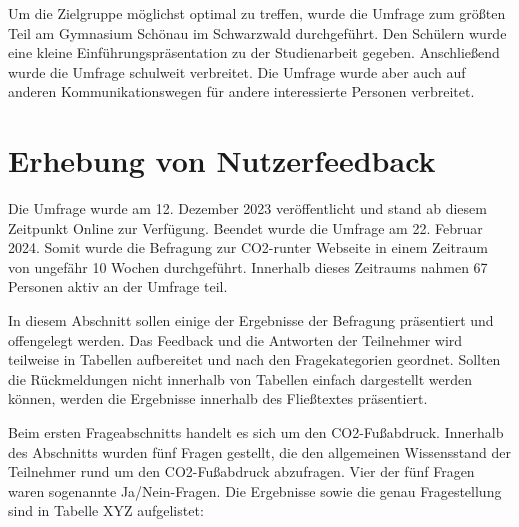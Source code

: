 Um die Zielgruppe möglichst optimal zu treffen, wurde die Umfrage zum größten Teil am Gymnasium Schönau im Schwarzwald durchgeführt.
Den Schülern wurde eine kleine Einführungspräsentation zu der Studienarbeit gegeben.
Anschließend wurde die Umfrage schulweit verbreitet.
Die Umfrage wurde aber auch auf anderen Kommunikationswegen für andere interessierte Personen verbreitet.

\section{Erhebung von Nutzerfeedback}
Die Umfrage wurde am 12. Dezember 2023 veröffentlicht und stand ab diesem Zeitpunkt Online zur Verfügung.
Beendet wurde die Umfrage am 22. Februar 2024.
Somit wurde die Befragung zur CO2-runter Webseite in einem Zeitraum von ungefähr 10 Wochen durchgeführt.
Innerhalb dieses Zeitraums nahmen 67 Personen aktiv an der Umfrage teil.

In diesem Abschnitt sollen einige der Ergebnisse der Befragung präsentiert und offengelegt werden.
Das Feedback und die Antworten der Teilnehmer wird teilweise in Tabellen aufbereitet und nach den Fragekategorien geordnet.
Sollten die Rückmeldungen nicht innerhalb von Tabellen einfach dargestellt werden können, werden die Ergebnisse innerhalb des Fließtextes präsentiert.

Beim ersten Frageabschnitts handelt es sich um den CO2-Fußabdruck.
Innerhalb des Abschnitts wurden fünf Fragen gestellt, die den allgemeinen Wissensstand der Teilnehmer rund um den CO2-Fußabdruck abzufragen.
Vier der fünf Fragen waren sogenannte Ja/Nein-Fragen.
Die Ergebnisse sowie die genau Fragestellung sind in Tabelle XYZ aufgelistet: \newline

